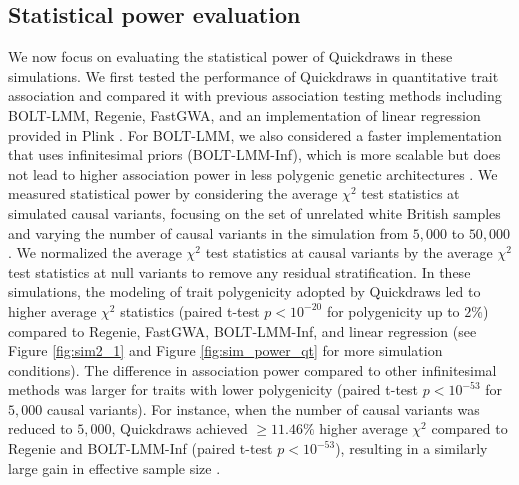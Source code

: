 \endgroup %

\clearpage

\subsection{Statistical power evaluation}
We now focus on evaluating the statistical power of Quickdraws in these simulations.
%
We first tested the performance of Quickdraws in quantitative trait association and compared it with previous association testing methods including BOLT-LMM, Regenie, FastGWA, and an implementation of linear regression provided in Plink \cite{purcell2007plink,chang2015second}.
%
For BOLT-LMM, we also considered a faster implementation that uses infinitesimal priors (BOLT-LMM-Inf), which is more scalable but does not lead to higher association power in less polygenic genetic architectures \cite{loh2015efficient,loh2018mixed}.
%
We measured statistical power by considering the average $\chi^2$ test statistics at simulated causal variants, focusing on the set of unrelated white British samples and varying the number of causal variants in the simulation from $5{,}000$ to $50{,}000$ \cite{zeng2018signatures}.
%
We normalized the average $\chi^2$ test statistics at causal variants by the average $\chi^2$ test statistics at null variants to remove any residual stratification.
%
In these simulations, the modeling of trait polygenicity adopted by Quickdraws led to higher average $\chi^2$ statistics (paired t-test $p < 10^ {-20}$ for polygenicity up to $2\%$) compared to Regenie, FastGWA, BOLT-LMM-Inf, and linear regression (see Figure \ref{fig:sim2_1} and Figure \ref{fig:sim_power_qt} for more simulation conditions).
%
The difference in association power compared to other infinitesimal methods was larger for traits with lower polygenicity (paired t-test $p < 10^{-53}$ for $5{,}000$ causal variants).
%
For instance, when the number of causal variants was reduced to ${5{,}000}$, Quickdraws achieved $\geq 11.46\%$ higher average $\chi^2$ compared to Regenie and BOLT-LMM-Inf (paired t-test $p < 10^{-53}$), resulting in a similarly large gain in effective sample size \cite{yang2011genomic}.
%

